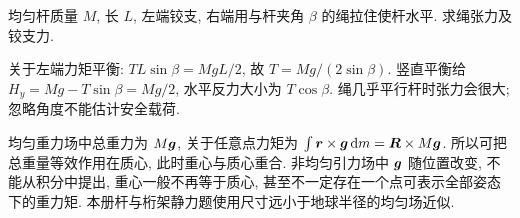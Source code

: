 \begin{example}
均匀杆质量 $M$, 长 $L$, 左端铰支, 右端用与杆夹角 $\beta$ 的绳拉住使杆水平. 求绳张力及铰支力.
\end{example}
\begin{solution}
关于左端力矩平衡: $TL\sin\beta=MgL/2$, 故 $T=Mg/(2\sin\beta)$. 竖直平衡给 $H_y=Mg-T\sin\beta=Mg/2$, 水平反力大小为 $T\cos\beta$. 绳几乎平行杆时张力会很大; 忽略角度不能估计安全载荷.
\end{solution}
均匀重力场中总重力为 $M\boldsymbol{g}$, 关于任意点力矩为 $\int\boldsymbol{r}\times\boldsymbol{g}\,\mathrm d m=\boldsymbol{R}\times M\boldsymbol{g}$. 所以可把总重量等效作用在质心, 此时重心与质心重合. 非均匀引力场中 $\boldsymbol{g}$ 随位置改变, 不能从积分中提出, 重心一般不再等于质心, 甚至不一定存在一个点可表示全部姿态下的重力矩. 本册杆与桁架静力题使用尺寸远小于地球半径的均匀场近似.
